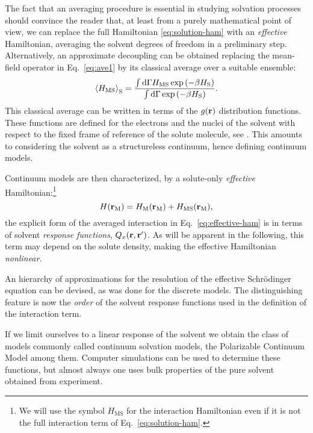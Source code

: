 The fact that an averaging procedure is essential in studying solvation
processes should convince the reader that, at least from a purely
mathematical point of view, we can replace the full Hamiltonian
\eqref{eq:solution-ham} with an \emph{effective} Hamiltonian, averaging
the solvent degrees of freedom in a preliminary
step.~\autocite{Angyan1992-vo, Tapia1992-pu}
Alternatively, an approximate decoupling can be obtained replacing the
mean-field operator in Eq.~\eqref{eq:ave1} by its classical average over
a suitable ensemble:
\begin{equation}\label{eq:ave_classic}
 \Braket{H_\mathrm{MS}}_\mathrm{S} = \frac{\int\mathop{}\!\mathrm{d}\Gamma H_\mathrm{MS}\exp
\left(-\beta H_\mathrm{S}\right)}{\int\mathop{}\!\mathrm{d}\Gamma\exp\left(-\beta H_\mathrm{S}\right)}.
\end{equation}
This classical average can be written in terms of the $g(\mathbf{r})$ distribution functions. These functions are defined
for the electrons and the nuclei of the solvent with respect to the fixed frame of reference of the solute molecule, see .
This amounts to considering the solvent as a structureless continuum, hence defining continuum models.

Continuum models are then characterized, by a solute-only
\emph{effective} Hamiltonian:\footnote{We will use the symbol
$H_\mathrm{MS}$ for the interaction Hamiltonian even if it is not the
full interaction term of Eq.~\eqref{eq:solution-ham}.}
\begin{equation}\label{eq:effective-ham}
 H(\mathbf{r}_\mathrm{M}) = H_\mathrm{M}(\mathbf{r}_\mathrm{M})
+ H_\mathrm{MS}(\mathbf{r}_\mathrm{M}),
\end{equation}
the explicit form of the averaged interaction in
Eq.~\eqref{eq:effective-ham} is in terms of solvent \emph{response
functions}, $Q_x(\mathbf{r},\mathbf{r}^\prime)$.
As will be apparent in the following, this term may depend on the solute
density, making the effective Hamiltonian \emph{nonlinear}.

An hierarchy of approximations for the resolution of the effective
Schr\"odinger equation can be devised, as was done for the discrete
models. The distinguishing feature is now the \emph{order} of the
solvent response functions used in the definition of the interaction
term.

If we limit ourselves to a linear response of the solvent we obtain the
class of models commonly called continuum solvation models, the
Polarizable Continuum Model among them. Computer simulations can be used
to determine these functions, but almost always one uses bulk properties
of the pure solvent obtained from experiment.

